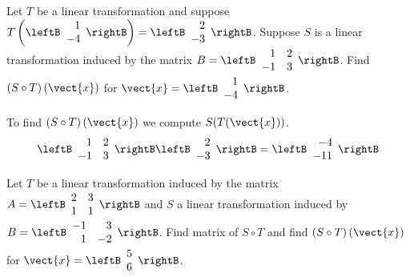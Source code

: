 \begin{enumialphparenastyle}
\begin{ex}
\begin{sol}
\end{sol}
\end{ex}


\begin{ex} Let $T$ be a linear transformation and suppose $T \left( \leftB \begin{array}{r}
1 \\
-4 
\end{array} \rightB \right) = \leftB \begin{array}{r}
2 \\
-3 
\end{array} \rightB$. Suppose $S$ is a linear transformation induced by the matrix $B = \leftB \begin{array}{rr}
1 & 2 \\
-1 & 3
\end{array} \rightB$. Find $\left( S \circ T \right) \left( \vect{x} \right)$ for $\vect{x} = \leftB \begin{array}{r}
1 \\
-4
\end{array} \rightB$. 
\begin{sol}
To find $\left( S \circ T \right) \left( \vect{x} \right)$ we compute $S(T(\vect{x}))$. 
\[
\leftB \begin{array}{rr}
1 & 2 \\
-1 & 3
\end{array} \rightB
\leftB \begin{array}{r}
2 \\
-3 
\end{array} \rightB
 = \leftB
\begin{array}{r}
-4 \\
-11
\end{array}
\rightB
\]
\end{sol}
\end{ex}


\begin{ex}  Let $T$ be a linear transformation induced by the matrix $A = \leftB \begin{array}{rr}
2 & 3 \\
1 & 1
\end{array}\rightB$ and $S$ a linear transformation induced by $B = \leftB \begin{array}{rr}
-1 & 3 \\
1 & -2 
\end{array}\rightB$. Find matrix of $S \circ T$ and find $\left( S \circ T \right) \left( \vect{x} \right)$ for $\vect{x} = \leftB \begin{array}{r}
5 \\
6 
\end{array} \rightB$. 
\end{ex}



\end{enumialphparenastyle}
